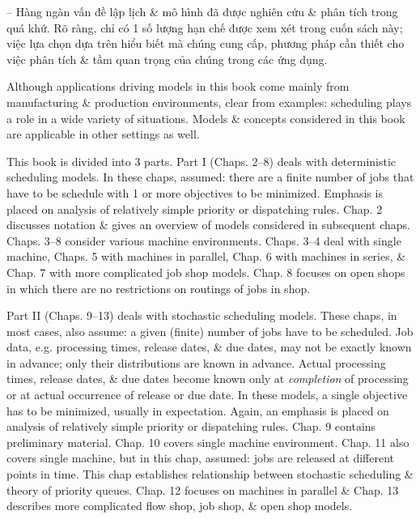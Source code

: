 \documentclass{article}
\begin{document}
\begin{itemize}
\begin{itemize}
        -- Hàng ngàn vấn đề lập lịch \& mô hình đã được nghiên cứu \& phân tích trong quá khứ. Rõ ràng, chỉ có 1 số lượng hạn chế được xem xét trong cuốn sách này; việc lựa chọn dựa trên hiểu biết mà chúng cung cấp, phương pháp cần thiết cho việc phân tích \& tầm quan trọng của chúng trong các ứng dụng.
        
        Although applications driving models in this book come mainly from manufacturing \& production environments, clear from examples: scheduling plays a role in a wide variety of situations. Models \& concepts considered in this book are applicable in other settings as well.
        
        This book is divided into 3 parts. Part I (Chaps. 2--8) deals with deterministic scheduling models. In these chaps, assumed: there are a finite number of jobs that have to be schedule with 1 or more objectives to be minimized. Emphasis is placed on analysis of relatively simple priority or dispatching rules. Chap. 2 discusses notation \& gives an overview of models considered in subsequent chaps. Chaps. 3--8 consider various machine environments. Chaps. 3--4 deal with single machine, Chaps. 5 with machines in parallel, Chap. 6 with machines in series, \& Chap. 7 with more complicated job shop models. Chap. 8 focuses on open shops in which there are no restrictions on routings of jobs in shop.
        
        Part II (Chaps. 9--13) deals with stochastic scheduling models. These chaps, in most cases, also assume: a given (finite) number of jobs have to be scheduled. Job data, e.g. processing times, release dates, \& due dates, may not be exactly known in advance; only their distributions are known in advance. Actual processing times, release dates, \& due dates become known only at {\it completion} of processing or at actual occurrence of release or due date. In these models, a single objective has to be minimized, usually in expectation. Again, an emphasis is placed on analysis of relatively simple priority or dispatching rules. Chap. 9 contains preliminary material. Chap. 10 covers single machine environment. Chap. 11 also covers single machine, but in this chap, assumed: jobs are released at different points in time. This chap establishes relationship between stochastic scheduling \& theory of priority queues. Chap. 12 focuses on machines in parallel \& Chap. 13 describes more complicated flow shop, job shop, \& open shop models.
        

\end{itemize}
\end{itemize}
\end{document}
